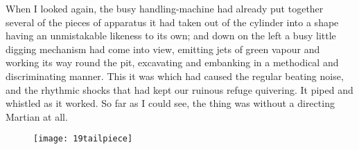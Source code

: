 When I looked again, the busy handling-machine had already put together several of the pieces of apparatus it had taken out of the cylinder into a shape having an unmistakable likeness to its own; and down on the left a busy little digging mechanism had come into view, emitting jets of green vapour and working its way round the pit, excavating and embanking in a methodical and discriminating manner. This it was which had caused the regular beating noise, and the rhythmic shocks that had kept our ruinous refuge quivering. It piped and whistled as it worked. So far as I could see, the thing was without a directing Martian at all.

\begin{figure}[b!]
\centering
\texttt{[image: 19tailpiece]}
\end{figure}